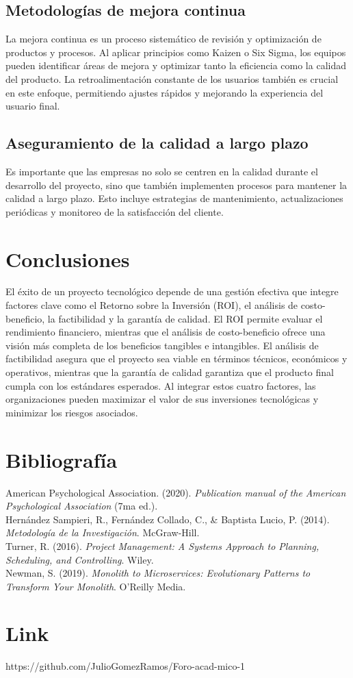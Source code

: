 \documentclass[12pt]{article}
\begin{document}
\subsection{Metodologías de mejora continua}
La mejora continua es un proceso sistemático de revisión y optimización de productos y procesos. Al aplicar principios como Kaizen o Six Sigma, los equipos pueden identificar áreas de mejora y optimizar tanto la eficiencia como la calidad del producto. La retroalimentación constante de los usuarios también es crucial en este enfoque, permitiendo ajustes rápidos y mejorando la experiencia del usuario final.

\subsection{Aseguramiento de la calidad a largo plazo}
Es importante que las empresas no solo se centren en la calidad durante el desarrollo del proyecto, sino que también implementen procesos para mantener la calidad a largo plazo. Esto incluye estrategias de mantenimiento, actualizaciones periódicas y monitoreo de la satisfacción del cliente.

\section{Conclusiones}
El éxito de un proyecto tecnológico depende de una gestión efectiva que integre factores clave como el Retorno sobre la Inversión (ROI), el análisis de costo-beneficio, la factibilidad y la garantía de calidad. El ROI permite evaluar el rendimiento financiero, mientras que el análisis de costo-beneficio ofrece una visión más completa de los beneficios tangibles e intangibles. El análisis de factibilidad asegura que el proyecto sea viable en términos técnicos, económicos y operativos, mientras que la garantía de calidad garantiza que el producto final cumpla con los estándares esperados. Al integrar estos cuatro factores, las organizaciones pueden maximizar el valor de sus inversiones tecnológicas y minimizar los riesgos asociados.

\section*{Bibliografía}
American Psychological Association. (2020). \textit{Publication manual of the American Psychological Association} (7ma ed.).\\
Hernández Sampieri, R., Fernández Collado, C., \& Baptista Lucio, P. (2014). \textit{Metodología de la Investigación}. McGraw-Hill.\\
Turner, R. (2016). \textit{Project Management: A Systems Approach to Planning, Scheduling, and Controlling}. Wiley.\\
Newman, S. (2019). \textit{Monolith to Microservices: Evolutionary Patterns to Transform Your Monolith}. O'Reilly Media.

\section*{Link} 
https://github.com/JulioGomezRamos/Foro-acad-mico-1
\end{document}
